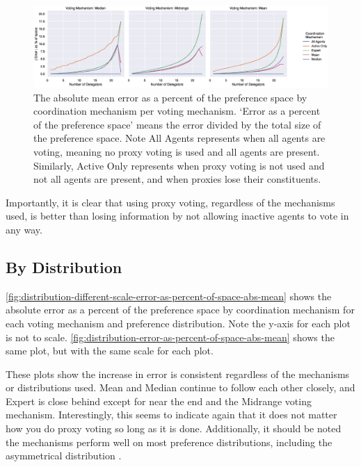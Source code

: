 \begin{landscape}
    \begin{figure}[p]
        \centering
        \includegraphics[scale=0.55]
        {content/chapter2/figures/vm_col_cm_hue_error_as_percent_of_space_abs_mean}
        \caption{
            The absolute mean error as a percent of the preference space by
            coordination mechanism per voting mechanism.
            `Error as a percent of the preference space' means the error divided by
            the total size of the preference space.
            Note All Agents represents when all agents are voting, meaning no proxy
            voting is used and all agents are present.
            Similarly, Active Only represents when proxy voting is not used and not
            all agents are present, and when proxies lose their constituents.
        }
        \label{fig:vm-col-cm-hue-error-as-percent-of-space-abs-mean}
    \end{figure}
\end{landscape}

Importantly, it is clear that using proxy voting, regardless of the mechanisms used,
is better than losing information by not allowing inactive agents to vote in any way.

\subsection{By Distribution}\label{subsec:results-distribution}
\autoref{fig:distribution-different-scale-error-as-percent-of-space-abs-mean} shows
the absolute error as a percent of the preference space by coordination mechanism for
each voting mechanism and preference distribution.
Note the y-axis for each plot is not to scale.
\autoref{fig:distribution-error-as-percent-of-space-abs-mean} shows the same plot,
but with the same scale for each plot.

These plots show the increase in error is consistent regardless of the mechanisms or
distributions used.
Mean and Median continue to follow each other closely, and Expert is close behind
except for near the end and the Midrange voting mechanism.
Interestingly, this seems to indicate again that it does not matter how you do proxy
voting so long as it is done.
Additionally, it should be noted the mechanisms perform well on most preference
distributions, including the asymmetrical distribution .

